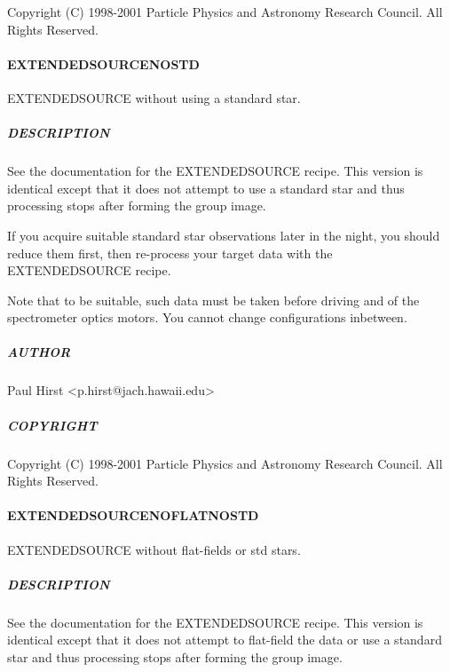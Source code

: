 \documentclass[twoside,11pt]{article}
\renewcommand{\_}{\texttt{\symbol{95}}}
\begin{document}
Copyright (C) 1998-2001 Particle Physics and Astronomy Research
Council. All Rights Reserved.

\paragraph*{EXTENDED\_SOURCE\_NOSTD\label{EXTENDED_SOURCE_NOSTD}}

EXTENDED\_SOURCE without using a standard star.

\subparagraph*{DESCRIPTION\label{EXTENDED_SOURCE_NOSTD_DESCRIPTION}}

See the documentation for the EXTENDED\_SOURCE recipe. This version is
identical except that it does not attempt to use a standard star and
thus processing stops after forming the group image.



If you acquire suitable standard star observations later in the night,
you should reduce them first, then re-process your target data with
the EXTENDED\_SOURCE recipe.



Note that to be suitable, such data must be taken before driving and
of the spectrometer optics motors. You cannot change configurations
inbetween.

\subparagraph*{AUTHOR\label{EXTENDED_SOURCE_NOSTD_AUTHOR}}

Paul Hirst <p.hirst@jach.hawaii.edu>

\subparagraph*{COPYRIGHT\label{EXTENDED_SOURCE_NOSTD_COPYRIGHT}}

Copyright (C) 1998-2001 Particle Physics and Astronomy Research
Council. All Rights Reserved.

\paragraph*{EXTENDED\_SOURCE\_NOFLAT\_NOSTD\label{EXTENDED_SOURCE_NOFLAT_NOSTD}}

EXTENDED\_SOURCE without flat-fields or std stars.

\subparagraph*{DESCRIPTION\label{EXTENDED_SOURCE_NOFLAT_NOSTD_DESCRIPTION}}

See the documentation for the EXTENDED\_SOURCE recipe. This version is
identical except that it does not attempt to flat-field the data or
use a standard star and thus processing stops after forming the group
image.
\end{document}
